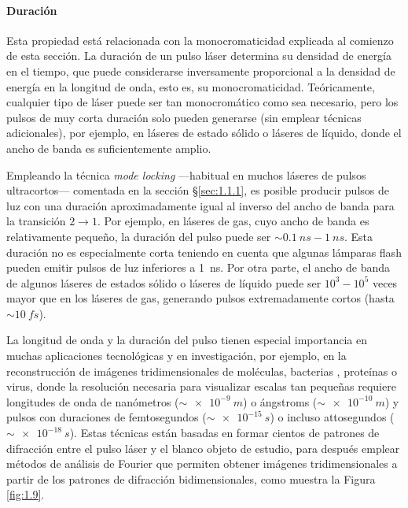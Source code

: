 \paragraph{Duración}
Esta propiedad está relacionada con la monocromaticidad explicada al comienzo de esta sección. La duración de un pulso láser determina su densidad de energía en el tiempo, que puede considerarse inversamente proporcional a la densidad de energía en la longitud de onda, esto es, su monocromaticidad\autocite{Svelto2010}. Teóricamente, cualquier tipo de láser puede ser tan monocromático como sea necesario, pero los pulsos de muy corta duración solo pueden generarse (sin emplear técnicas adicionales), por ejemplo, en láseres de estado sólido o láseres de líquido, donde el ancho de banda es suficientemente amplio.

Empleando la técnica \emph{mode locking} ---habitual en muchos láseres de pulsos ultracortos--- comentada en la sección \S\ref{sec:1.1.1}, es posible producir pulsos de luz con una duración aproximadamente igual al inverso del ancho de banda para la transición $2 \rightarrow 1$. Por ejemplo, en láseres de gas, cuyo ancho de banda es relativamente pequeño, la duración del pulso puede ser $\sim\qty{0,1}{ns}-\qty{1}{ns}$. Esta duración no es especialmente corta teniendo en cuenta que algunas lámparas flash pueden emitir pulsos de luz inferiores a \qty{1}{ns}. Por otra parte, el ancho de banda de algunos láseres de estados sólido o láseres de líquido puede ser $10^3-10^5$ veces mayor que en los láseres de gas, generando pulsos extremadamente cortos (hasta $\sim\qty{10}{fs}$).

La longitud de onda y la duración del pulso tienen especial importancia en muchas aplicaciones tecnológicas y en investigación, por ejemplo, en la reconstrucción de imágenes tridimensionales de moléculas\autocite{vonArdenne2018}, bacterias \autocite{Fan2016}, proteínas \autocite{Neutze2000} o virus\autocite{Ekeberg2015}, donde la resolución necesaria para visualizar escalas tan pequeñas requiere longitudes de onda de nanómetros ($\sim\qty{e-9}{m}$) o ángstroms ($\sim\qty{e-10}{m}$) y pulsos con duraciones de femtosegundos ($\sim\qty{e-15}{s}$) o incluso attosegundos ($\sim\qty{e-18}{s}$). Estas técnicas están basadas en formar cientos de patrones de difracción entre el pulso láser y el blanco objeto de estudio, para después emplear métodos de análisis de Fourier que permiten obtener imágenes tridimensionales a partir de los patrones de difracción bidimensionales, como muestra la Figura \ref{fig:1.9}.

